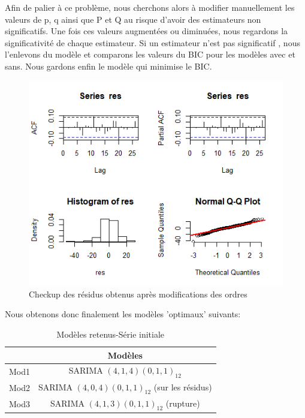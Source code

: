 \documentclass[12pt,a4paper]{book}
\newcommand{\1}{\mathds{1}}
\begin{document}
Afin de palier à ce problème, nous cherchons alors à modifier manuellement les valeurs de p, q ainsi que P et Q au risque d'avoir des estimateurs non significatifs. Une fois ces valeurs augmentées ou diminuées, nous regardons la significativité de chaque estimateur. Si un estimateur n'est pas significatif , nous l'enlevons du modèle et comparons les valeurs du BIC pour les modèles avec et sans. Nous gardons enfin le modèle qui minimise le BIC.

\begin{figure}[h]
\centering
    \includegraphics[width=\textwidth]{beaux_residus}  
\caption{Checkup des résidus obtenus après modifications des ordres}
\end{figure}

\noindent
Nous obtenons donc finalement les modèles 'optimaux' suivants:

\begin{table}[h]
  \begin{center}
    \caption{Modèles retenus-Série initiale}
    \label{tab:table1}
    \begin{tabular}{l|c}
      \ & \textbf{Modèles}\\
      \hline
      Mod1 & SARIMA $(4,1,4)(0,1,1)_{12}$\\
      Mod2 & SARIMA $(4,0,4)(0,1,1)_{12}$ (sur les résidus)\\
      Mod3 & SARIMA  $(4,1,3)(0,1,1)_{12}$ (rupture)\\
    \end{tabular}
  \end{center}
\end{table}
\end{document}
